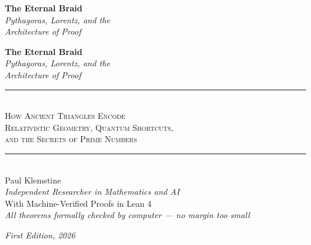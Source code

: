\documentclass[11pt,twoside,openright]{book}
\theoremstyle{definition}
\begin{document}
\begin{titlepage}
\thispagestyle{empty}
\vspace*{3cm}
\begin{center}
{\Huge\bfseries\color{deepblue} The Eternal Braid}\\[1.5cm]
{\Large\itshape Pythagoras, Lorentz, and the\\[0.3cm]
Architecture of Proof}
\end{center}
\vfill
\end{titlepage}

\cleardoublepage

\begin{titlepage}
\thispagestyle{empty}
\vspace*{1cm}

\begin{center}


\vspace{1cm}

{\fontsize{36}{42}\selectfont\bfseries\color{deepblue}
The Eternal Braid}\\[0.8cm]

{\fontsize{18}{22}\selectfont\itshape\color{gray}
Pythagoras, Lorentz, and the\\[0.2cm]
Architecture of Proof}\\[1.5cm]

\rule{8cm}{0.4pt}\\[1cm]

{\Large\scshape How Ancient Triangles Encode\\[0.2cm]
Relativistic Geometry, Quantum Shortcuts,\\[0.2cm]
and the Secrets of Prime Numbers}\\[1cm]

\rule{8cm}{0.4pt}\\[1.5cm]

{\LARGE Paul Klemstine}\\[0.3cm]
{\large\itshape Independent Researcher in Mathematics and AI}\\[2cm]

{\large With Machine-Verified Proofs in Lean 4}\\[0.5cm]
{\small\itshape All theorems formally checked by computer --- no margin too small}

\vfill

{\small\itshape First Edition, 2026}

\end{center}
\end{titlepage}
\end{document}
